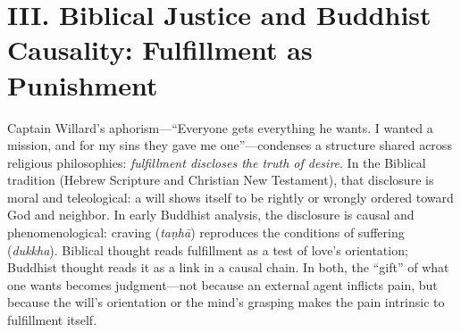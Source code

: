 \section*{III. Biblical Justice and Buddhist Causality: Fulfillment as Punishment}
\label{sec:iii-biblical-justice-and-buddhist-causality}

Captain Willard's aphorism---``Everyone gets everything he wants. I wanted a mission, and for
my sins they gave me one''---condenses a structure shared across religious philosophies:
\emph{fulfillment discloses the truth of desire}. In the Biblical tradition (Hebrew Scripture
and Christian New Testament), that disclosure is moral and teleological: a will shows itself to
be
rightly or wrongly ordered toward God and neighbor. In early Buddhist analysis, the disclosure
is causal and phenomenological: craving (\emph{taṇhā}) reproduces the conditions of suffering
(\emph{dukkha}). Biblical thought reads fulfillment as a test of love's orientation; Buddhist
thought reads it as a link in a causal chain. In both, the ``gift'' of what one wants becomes
judgment---not because an external agent inflicts pain, but because the will's orientation or
the mind's grasping makes the pain intrinsic to fulfillment itself.


\pagebreak[2]

\pagebreak[2]

\pagebreak[2]

\pagebreak[2]

